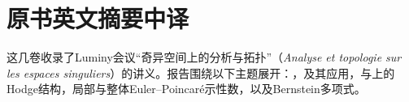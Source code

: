 \chapter*{原书英文摘要中译}
这几卷收录了Luminy会议“奇异空间上的分析与拓扑”（\emph{Analyse et topologie sur les espaces singuliers}）的讲义。报告围绕以下主题展开：，及其应用，与上的Hodge结构，局部与整体Euler--Poincaré示性数，以及Bernstein多项式。
